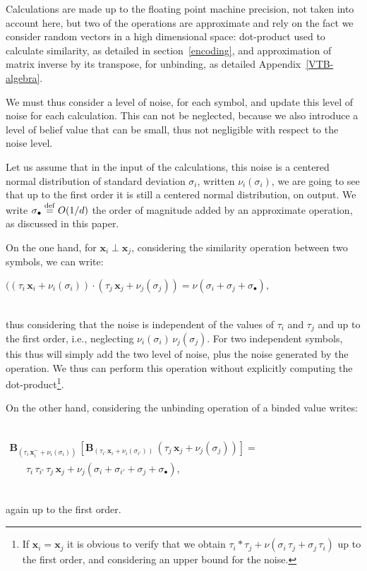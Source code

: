 \documentclass[sn-mathphys]{sn-jnl}
\newcommand{\defq}{\stackrel {\rm def}{=}}
\newcommand{\eqline}[1]{~\vspace{0.1cm}\\\centerline{$#1$}\vspace{0.1cm}\\}
\begin{document}
\begin{appendices}
Calculations are made up to the floating point machine precision, not taken into account here, but two of the operations are approximate and rely on the fact we consider random vectors in a high dimensional space: dot-product used to calculate similarity, as detailed in section~\ref{encoding}, and approximation of matrix inverse by its transpose, for unbinding, as detailed Appendix~\ref{VTB-algebra}.

We must thus consider a level of noise, for each symbol, and update this level of noise for each calculation. This can not be neglected, because we also introduce a level of belief value that can be small, thus not negligible with respect to the noise level.

Let us assume that in the input of the calculations, this noise is a centered normal distribution of standard deviation $\sigma_i$, written $\nu_i(\sigma_i)$, we are going to see that up to the first order it is still a centered normal distribution, on output. We write $\sigma_\bullet \defq O(1/d)$ the order of magnitude added by an approximate operation, as discussed in this paper.

On the one hand, for $\mathbf{x}_i \perp \mathbf{x}_j$, considering the similarity operation between two symbols, we can write:
\eqline{((\tau_i \, \mathbf{x}_i + \nu_i(\sigma_i)) \cdot (\tau_j \, \mathbf{x}_j + \nu_j(\sigma_j)) = \nu(\sigma_i + \sigma_j + \sigma_\bullet),}
thus considering that the noise is independent of the values of $\tau_i$ and $\tau_j$ and up to the first order, i.e., neglecting $\nu_i(\sigma_i) \, \nu_j(\sigma_j)$. For two independent symbols, this thus will simply add the two level of noise, plus the noise generated by the operation. We thus can perform this operation without explicitly computing the dot-product\footnote{If $\mathbf{x}_i = \mathbf{x}_j$ it is obvious to verify that we obtain $\tau_i * \tau_j + \nu(\sigma_i \, \tau_j + \sigma_j \, \tau_i)$ up to the first order, and considering an upper bound for the noise.}.

On the other hand, considering the unbinding operation of a binded value writes:
\eqline{\begin{array}{l}\mathbf{B}_{(\tau_i \, \mathbf{x}_i^\sim + \nu_i(\sigma_i))} \, \left[\mathbf{B}_{(\tau_{i'} \, \mathbf{x}_i + \nu_i(\sigma_{i'}))} \, (\tau_j \, \mathbf{x}_j + \nu_j(\sigma_j)) \right] = \\ \;\;\;\;\;\; \tau_i \, \tau_{i'} \, \tau_j \, \mathbf{x}_j + \nu_j(\sigma_i + \sigma_{i'} + \sigma_{j} + \sigma_\bullet),\end{array}}
again up to the first order.


\end{appendices}
\end{document}

